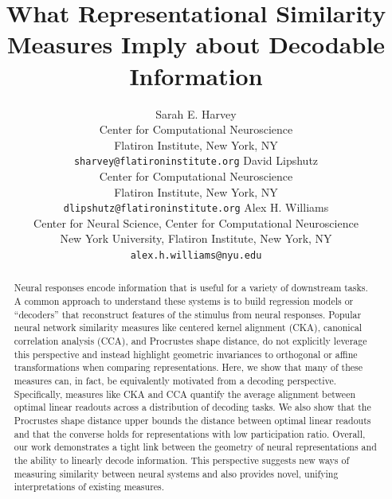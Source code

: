 \documentclass{article}
\title{What Representational Similarity Measures Imply about Decodable Information}
\author{%
  Sarah E. Harvey\\
  Center for Computational Neuroscience\\
  Flatiron Institute, New York, NY\\
  \texttt{sharvey@flatironinstitute.org}
  \And
  David Lipshutz\\
  Center for Computational Neuroscience\\
  Flatiron Institute, New York, NY\\
  \texttt{dlipshutz@flatironinstitute.org}
  \And
  Alex H. Williams\\
  Center for Neural Science, Center for Computational Neuroscience\\
  New York University, Flatiron Institute, New York, NY\\
  \texttt{alex.h.williams@nyu.edu}
}
\begin{document}
\maketitle


\begin{abstract}
Neural responses encode information that is useful for a variety of downstream tasks.
A common approach to understand these systems is to build regression models or ``decoders'' that reconstruct features of the stimulus from neural responses.
Popular neural network similarity measures like centered kernel alignment (CKA), canonical correlation analysis (CCA), and Procrustes shape distance, do not explicitly leverage this perspective and instead highlight geometric invariances to orthogonal or affine transformations when comparing representations.
Here, we show that many of these measures can, in fact, be equivalently motivated from a decoding perspective.
Specifically, measures like CKA and CCA quantify the average alignment between optimal linear readouts across a distribution of decoding tasks. 
We also show that the Procrustes shape distance upper bounds the distance between optimal linear readouts and that the converse holds for representations with low participation ratio.
Overall, our work demonstrates a tight link between the geometry of neural representations and the ability to linearly decode information.
This perspective suggests new ways of measuring similarity between neural systems and also provides novel, unifying interpretations of existing measures. 
\end{abstract}








\printbibliography
\clearpage

\begin{appendices}


\end{appendices}
\end{document}
